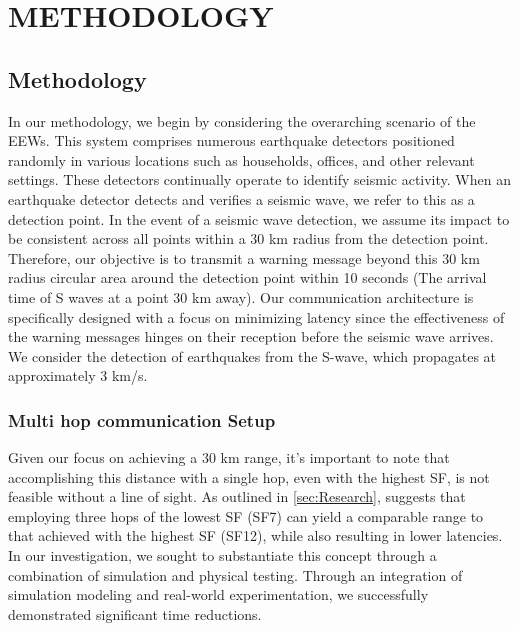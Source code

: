\chapter{METHODOLOGY}

\section{Methodology}\label{ch:Methodology}

\hspace{12pt} In our methodology, we begin by considering the overarching scenario of the \ac{EEWs}. This system comprises numerous earthquake detectors positioned randomly in various locations such as households, offices, and other relevant settings. These detectors continually operate to identify seismic activity. When an earthquake detector detects and verifies a seismic wave, we refer to this as a detection point. In the event of a seismic wave detection, we assume its impact to be consistent across all points within a 30 km radius from the detection point. Therefore, our objective is to transmit a warning message beyond this 30 km radius circular area around the detection point within 10 seconds (The arrival time of S waves at a point 30 km away). Our communication architecture is specifically designed with a focus on minimizing latency since the effectiveness of the warning messages hinges on their reception before the seismic wave arrives. We consider the detection of earthquakes from the S-wave, which propagates at approximately 3 km/s.\\

\subsection{Multi hop communication Setup}
\label{sec:multihop}
\hspace{12pt} Given our focus on achieving a 30 km range, it's important to note that accomplishing this distance with a single hop, even with the highest \ac{SF}, is not feasible without a line of sight. As outlined in \autoref{sec:Research}, \cite{farooq} suggests that employing three hops of the lowest \ac{SF} (SF7) can yield a comparable range to that achieved with the highest \ac{SF} (SF12), while also resulting in lower latencies. In our investigation, we sought to substantiate this concept through a combination of simulation and physical testing. Through an integration of simulation modeling and real-world experimentation, we successfully demonstrated significant time reductions.\\

